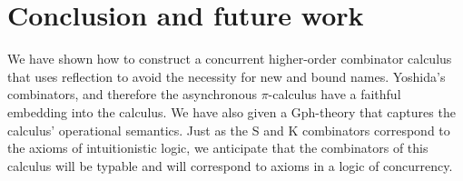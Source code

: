 \documentclass{llncs}
\newcommand{\pic}{$\pi$-calculus}
\begin{document}
\section{Conclusion and future work}
We have shown how to construct a concurrent higher-order combinator
calculus that uses reflection to avoid the necessity for new and bound
names.  Yoshida's combinators, and therefore the asynchronous {\pic}
have a faithful embedding into the calculus.  We have also given a
Gph-theory that captures the calculus' operational semantics.  Just as
the S and K combinators correspond to the axioms of intuitionistic
logic, we anticipate that the combinators of this calculus will be
typable and will correspond to axioms in a logic of concurrency.



\end{document}
